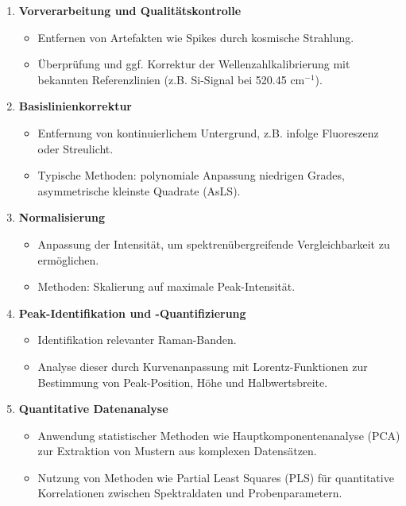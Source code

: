 \begin{enumerate}
    \item \textbf{Vorverarbeitung und Qualitätskontrolle}
    \begin{itemize}
        \item Entfernen von Artefakten wie Spikes durch kosmische Strahlung.
        \item Überprüfung und ggf. Korrektur der Wellenzahlkalibrierung mit bekannten Referenzlinien (z.B. Si-Signal bei 520.45 cm$^{-1}$).
    \end{itemize}
    
    \item \textbf{Basislinienkorrektur}
    \begin{itemize}
        \item Entfernung von kontinuierlichem Untergrund, z.B. infolge Fluoreszenz oder Streulicht.
        \item Typische Methoden: polynomiale Anpassung niedrigen Grades, asymmetrische kleinste Quadrate (AsLS).
    \end{itemize}
    
    \item \textbf{Normalisierung}
    \begin{itemize}
        \item Anpassung der Intensität, um spektrenübergreifende Vergleichbarkeit zu ermöglichen.
        \item Methoden: Skalierung auf maximale Peak-Intensität.
    \end{itemize}
    
    \item \textbf{Peak-Identifikation und -Quantifizierung}
    \begin{itemize}
        \item Identifikation relevanter Raman-Banden.
        \item Analyse dieser durch Kurvenanpassung mit Lorentz-Funktionen zur Bestimmung von Peak-Position, Höhe und Halbwertsbreite.
    \end{itemize}
    
    \item \textbf{Quantitative Datenanalyse}
    \begin{itemize}
        \item Anwendung statistischer Methoden wie Hauptkomponentenanalyse (PCA) zur Extraktion von Mustern aus komplexen Datensätzen.
        \item Nutzung von Methoden wie Partial Least Squares (PLS) für quantitative Korrelationen zwischen Spektraldaten und Probenparametern.
    \end{itemize}
\end{enumerate}

